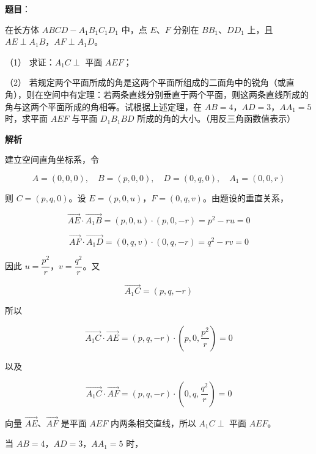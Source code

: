 \begin{answer}

\textbf{题目}：

在长方体 $ABCD-A_1B_1C_1D_1$ 中，点 $E\text{、}F$ 分别在 $BB_1\text{、}DD_1$ 上，且 $AE\perp A_1B$，$AF\perp A_1D$。
\nopagebreak[4]
\begin{center}\end{center}
\nopagebreak[4]
（1） 求证：$A_1C\perp$ 平面 $AEF$；

（2） 若规定两个平面所成的角是这两个平面所组成的二面角中的锐角（或直角），则在空间中有定理：若两条直线分别垂直于两个平面，则这两条直线所成的角与这两个平面所成的角相等。试根据上述定理，在 $AB=4$，$AD=3$，$AA_1=5$ 时，求平面 $AEF$ 与平面 $D_1B_1BD$ 所成的角的大小。（用反三角函数值表示）

\textbf{解析}


建立空间直角坐标系，令

\nopagebreak[4]
\[
A=(0,0,0),\quad B=(p,0,0),\quad D=(0,q,0),\quad A_1=(0,0,r)
\]

则 $C=(p,q,0)$。设 $E=(p,0,u)$，$F=(0,q,v)$。由题设的垂直关系，

\nopagebreak[4]
\[
\overrightarrow{AE}\cdot\overrightarrow{A_1B}
=(p,0,u)\cdot(p,0,-r)
=p^2-ru=0
\]

\nopagebreak[4]
\[
\overrightarrow{AF}\cdot\overrightarrow{A_1D}
=(0,q,v)\cdot(0,q,-r)
=q^2-rv=0
\]

因此 $u=\dfrac{p^2}{r}$，$v=\dfrac{q^2}{r}$。又

\nopagebreak[4]
\[
\overrightarrow{A_1C}=(p,q,-r)
\]

所以

\nopagebreak[4]
\[
\overrightarrow{A_1C}\cdot\overrightarrow{AE}
=(p,q,-r)\cdot\left(p,0,\frac{p^2}{r}\right)=0
\]

以及

\nopagebreak[4]
\[
\overrightarrow{A_1C}\cdot\overrightarrow{AF}
=(p,q,-r)\cdot\left(0,q,\frac{q^2}{r}\right)=0
\]

向量 $\overrightarrow{AE}$、$\overrightarrow{AF}$ 是平面 $AEF$ 内两条相交直线，所以 $A_1C\perp$ 平面 $AEF$。


当 $AB=4$，$AD=3$，$AA_1=5$ 时，


\end{answer}

